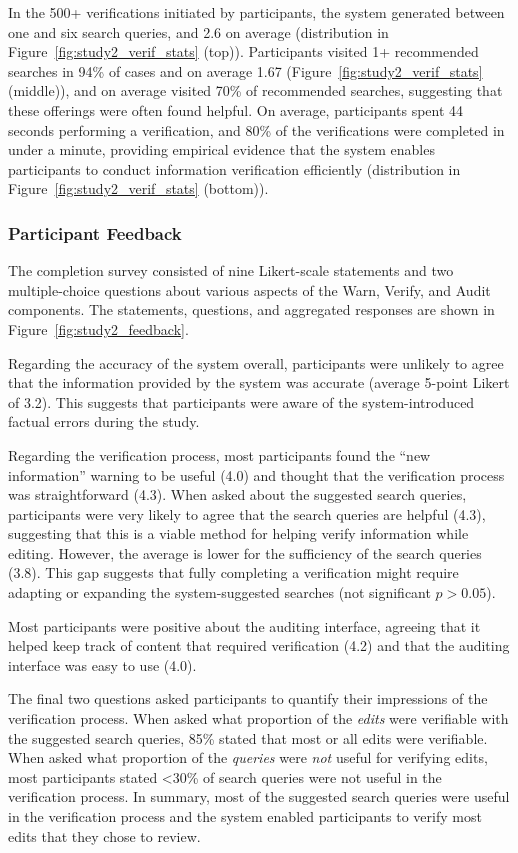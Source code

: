 \documentclass[manuscript]{acmart}
\begin{document}
In the 500+ verifications initiated by participants, the system generated between one and six search queries, and 2.6 on average (distribution in Figure~\ref{fig:study2_verif_stats} (top)). Participants visited 1+ recommended searches in 94\% of cases and on average 1.67 (Figure~\ref{fig:study2_verif_stats} (middle)), and on average visited 70\% of recommended searches, suggesting that these offerings were often found helpful. On average, participants spent 44 seconds performing a verification, and 80\% of the verifications were completed in under a minute, providing empirical evidence that the system enables participants to conduct information verification efficiently (distribution in Figure~\ref{fig:study2_verif_stats} (bottom)).

\subsubsection{Participant Feedback} \label{sec:study2_evaluation_feedback}

The completion survey consisted of nine Likert-scale statements and two multiple-choice questions about various aspects of the Warn, Verify, and Audit components. The statements, questions, and aggregated responses are shown in Figure~\ref{fig:study2_feedback}.

Regarding the accuracy of the system overall, participants were unlikely to agree that the information provided by the system was accurate (average 5-point Likert of 3.2). This suggests that participants were aware of the system-introduced factual errors during the study.

Regarding the verification process, most participants found the ``new information'' warning to be useful (4.0) and thought that the verification process was straightforward (4.3). When asked about the suggested search queries, participants were very likely to agree that the search queries are helpful (4.3), suggesting that this is a viable method for helping verify information while editing. However, the average is lower for the sufficiency of the search queries (3.8). This gap suggests that fully completing a verification might require adapting or expanding the system-suggested searches (not significant $p>0.05$).

Most participants were positive about the auditing interface, agreeing that it helped keep track of content that required verification (4.2) and that the auditing interface was easy to use (4.0).

The final two questions asked participants to quantify their impressions of the verification process. When asked what proportion of the \textit{edits} were verifiable with the suggested search queries, 85\% stated that most or all edits were verifiable.
When asked what proportion of the \textit{queries} were \textit{not} useful for verifying edits, most participants stated <30\% of search queries were not useful in the verification process. In summary, most of the suggested search queries were useful in the verification process and the system enabled participants to verify most edits that they chose to review.
\end{document}
